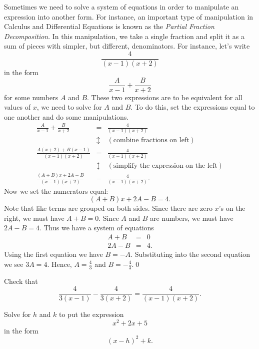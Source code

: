 \begin{eg} Sometimes we need to solve a system of equations in order to manipulate an expression into another form. For instance, an important type of manipulation in Calculus and Differential Equations is known as the {\it Partial Fraction Decomposition}. In this manipulation, we take a single fraction and split it as a sum of pieces with simpler, but different, denominators. For instance, let's write 
\[
\frac{4}{(x-1)(x+2)}
\]
in the form 
\[
\frac{A}{x-1} + \frac{B}{x+2}
\]
for some numbers $A$ and $B$. These two expressions are to be equivalent for all values of $x$, we need to solve for $A$ and $B$. To do this, set the expressions equal to one another and do some manipulations.
\begin{eqnarray*}
\frac{A}{x-1} + \frac{B}{x+2} & = & \frac{4}{(x-1)(x+2)}\\
\ & \updownarrow & (\mbox{combine fractions on left})\\
\frac{A(x+2) + B(x-1)}{(x-1)(x+2)} & = & \frac{4}{(x-1)(x+2)}\\
\ & \updownarrow & (\mbox{simplify the expression on the left})\\
\frac{(A+B)x + 2A -B}{(x-1)(x+2)} & = & \frac{4}{(x-1)(x+2)}.
\end{eqnarray*}
Now we set the numerators equal:
\[
(A+B)x + 2A-B = 4.
\]
Note that like terms are grouped on both sides. Since there are zero $x$'s on the right, we must have $A+B = 0$. Since $A$ and $B$ are numbers, we must have $2A-B = 4$. Thus we have a system of equations
\begin{eqnarray*}
A+B & = & 0\\
2A-B & = & 4.
\end{eqnarray*}
Using the first equation we have $B = -A$. Substituting into the second equation we see $3A = 4$. Hence, $A = \frac{4}{3}$ and $B=-\frac{4}{3}$.\qed \end{eg}

\par 

\begin{question} Check that
\[
\frac{4}{3(x-1)} - \frac{4}{3(x+2)} = \frac{4}{(x-1)(x+2)}.
\]
\end{question}

\par 

\begin{question} Solve for $h$ and $k$ to put the expression
\[
x^2+2x+5
\]
in the form
\[
(x-h)^2+k.
\]
\end{question}

